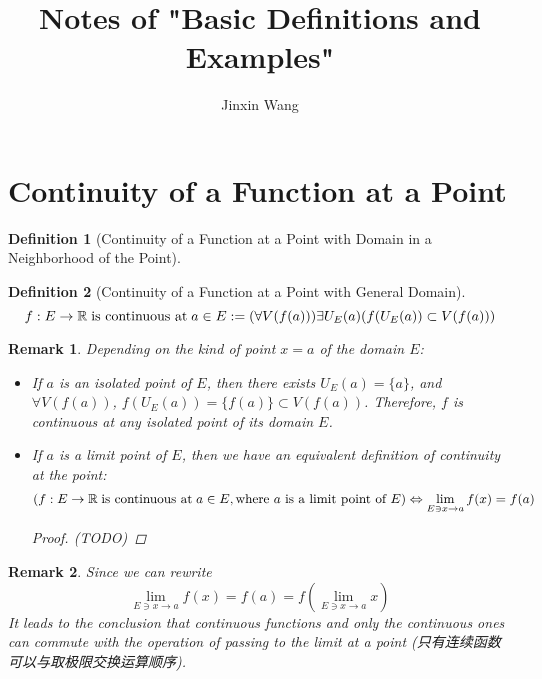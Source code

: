 \documentclass[onecolumn]{ctexart}
\title{Notes of "Basic Definitions and Examples"}
\author{Jinxin Wang}
\date{}
\newtheorem{definition}{Definition}
\newtheorem{remark}{Remark}
\begin{document}
\maketitle

\section{Continuity of a Function at a Point}

\begin{definition}[Continuity of a Function at a Point with Domain in a Neighborhood of the Point]
  
\end{definition}

\begin{definition}[Continuity of a Function at a Point with General Domain]
  \[
    f:E \to \mathbb{R} \thickspace \textnormal{is continuous at} \thickspace a \in E := 
    (\forall V(f(a))) \exists U_E(a) (f(U_E(a)) \subset V(f(a)))
  \]
\end{definition}
\begin{remark}
  Depending on the kind of point $x = a$ of the domain $E$:
  \begin{itemize}
    \item If $a$ is an isolated point of $E$, then there exists $U_E(a) = 
    \lbrace a \rbrace$, and $\forall V(f(a))$, $f(U_E(a)) = \lbrace f(a) \rbrace 
    \subset V(f(a))$. Therefore, $f$ is continuous at any isolated point of its 
    domain $E$.
    \item If $a$ is a limit point of $E$, then we have an equivalent definition 
    of continuity at the point:
    \begin{equation}
      (f:E \to \mathbb{R} \thickspace \textnormal{is continuous at} \thickspace 
      a \in E, \textnormal{where $a$ is a limit point of $E$}) \Leftrightarrow \lim_{E \owns x \to a} f(x) = f(a)
    \end{equation}
    \begin{proof}
      (TODO)
    \end{proof}
  \end{itemize}
\end{remark}
\begin{remark}
  Since we can rewrite
  \begin{equation}
    \lim_{E \owns x \to a} f(x) = f(a) = f(\lim_{E \owns x \to a} x)
  \end{equation}
  It leads to the conclusion that continuous functions and only the continuous 
  ones can commute with the operation of passing to the limit at a point (只有连续函数可以与取极限交换运算顺序).
\end{remark}
\end{document}
